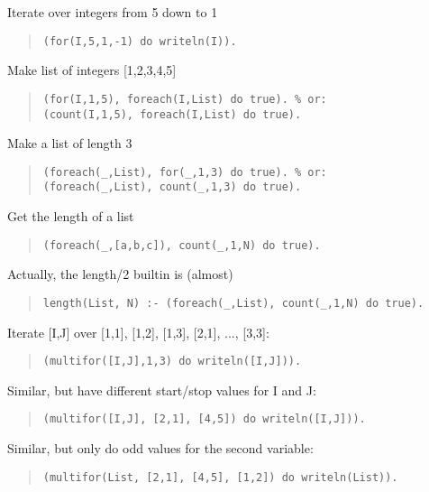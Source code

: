 Iterate over integers from 5 down to 1
\begin{quote}\begin{verbatim}
(for(I,5,1,-1) do writeln(I)).
\end{verbatim}\end{quote}

Make list of integers [1,2,3,4,5]
\begin{quote}\begin{verbatim}
(for(I,1,5), foreach(I,List) do true). % or:
(count(I,1,5), foreach(I,List) do true).
\end{verbatim}\end{quote}

Make a list of length 3
\begin{quote}\begin{verbatim}
(foreach(_,List), for(_,1,3) do true). % or:
(foreach(_,List), count(_,1,3) do true).
\end{verbatim}\end{quote}

Get the length of a list
\begin{quote}\begin{verbatim}
(foreach(_,[a,b,c]), count(_,1,N) do true).
\end{verbatim}\end{quote}

Actually, the length/2 builtin is (almost)
\begin{quote}\begin{verbatim}
length(List, N) :- (foreach(_,List), count(_,1,N) do true).
\end{verbatim}\end{quote}

Iterate [I,J] over [1,1], [1,2], [1,3], [2,1], ..., [3,3]:
\begin{quote}\begin{verbatim}
(multifor([I,J],1,3) do writeln([I,J])).
\end{verbatim}\end{quote}

Similar, but have different start/stop values for I and J:
\begin{quote}\begin{verbatim}
(multifor([I,J], [2,1], [4,5]) do writeln([I,J])).
\end{verbatim}\end{quote}

Similar, but only do odd values for the second variable:
\begin{quote}\begin{verbatim}
(multifor(List, [2,1], [4,5], [1,2]) do writeln(List)).
\end{verbatim}\end{quote}

